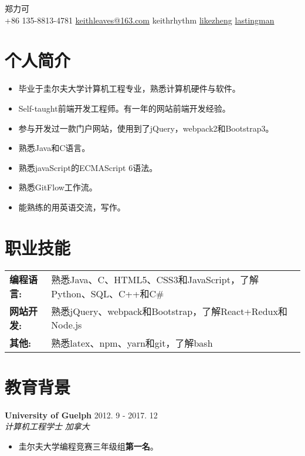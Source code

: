 \documentclass[10pt, letterpaper]{article}
\makeatletter
\newcommand*{\nametitle}[1]{{\fontsize{32pt}{1em}\color{awesome-emerald} #1 \\[0.6\baselineskip]}}
\newcommand*{\subinfo}[2]{\hspace{5pt} {\color{darktext}#1} \hspace*{2pt} {\color{lighttext}#2} \hspace{5pt}}
\newcommand{\information}[4]{
	\noindent
    \textbf{\color{darktext}#1} \hfill {#2} \\
    \textit{\color{hardtext}#3} \hfill \textit{\color{awesome-emerald}#4}
}
\newenvironment{skills}{
    \noindent
    \begin{tabular}{@{}l l@{}}
}{
    \end{tabular}
}
\newcommand*{\skill}[2]{
	\textbf{\color{darktext}#1} & {#2} \\
}
\makeatother
\begin{document}
\begin{center}
\nametitle{郑力可}
\subinfo{\faPhoneSquare}{+86 135-8813-4781}
\subinfo{\faEnvelope}{\href{mailto: keithleaves@163.com}{keithleaves@163.com}}
\subinfo{\faWechat}{keithrhythm}
\subinfo{\faLinkedinSquare}{\href{https://www.linkedin.com/in/likezheng/}{likezheng}}
\subinfo{\faGithub}{\href{https://github.com/lastingman}{lastingman}}
\end{center}


\color{lighttext}

\section*{个人简介}
\noindent
\begin{itemize}[leftmargin=*]
    \item 毕业于圭尔夫大学计算机工程专业，熟悉计算机硬件与软件。
    \item Self-taught前端开发工程师。有一年的网站前端开发经验。
    \item 参与开发过一款门户网站，使用到了jQuery，webpack2和Bootstrap3。
    \item 熟悉Java和C语言。
    \item 熟悉javaScript的ECMAScript 6语法。
    \item 熟悉GitFlow工作流。
    \item 能熟练的用英语交流，写作。
\end{itemize}

\section*{职业技能}
\begin{skills}
\skill{编程语言:}{熟悉Java、C、HTML5、CSS3和JavaScript，了解Python、SQL、C++和C\#}
\skill{网站开发:}{熟悉jQuery、webpack和Bootstrap，了解React+Redux和Node.js}
\skill{其他:}{熟悉latex、npm、yarn和git，了解bash}
\end{skills}

\section*{教育背景}

\information
	{University of Guelph}{2012. 9 - 2017. 12}
	{计算机工程学士}{加拿大}
\begin{itemize}[leftmargin=*]
\item 圭尔夫大学编程竞赛三年级组\textbf{第一名}。
\end{itemize}
\end{document}
